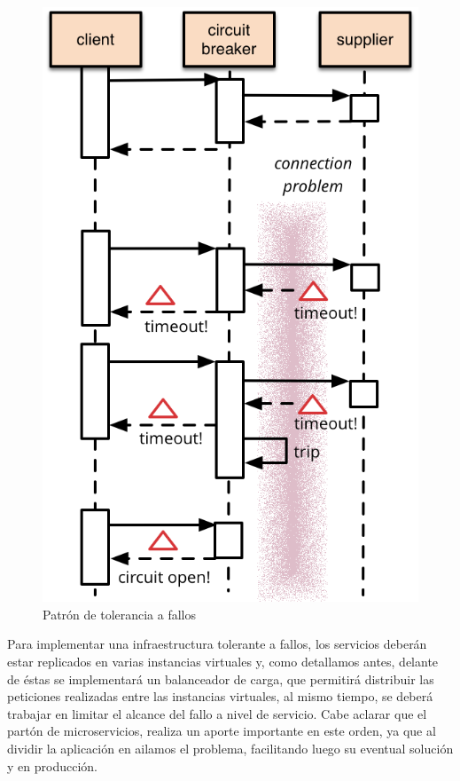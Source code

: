 \begin{figure}[H]
  \includegraphics[width=\linewidth]{src/images/04-capitulo-4/circuit_breaker.png}
  \caption{Patrón de tolerancia a fallos }
  \label{fig:circuit_breaker}
\end{figure}

Para implementar una infraestructura tolerante a fallos, los servicios deberán estar replicados en varias instancias virtuales y, como detallamos antes, delante de éstas se implementará un balanceador de carga, que permitirá distribuir las peticiones realizadas entre las instancias virtuales, al mismo tiempo, se deberá trabajar en limitar el alcance del fallo a nivel de servicio.  Cabe aclarar que el partón de microservicios, realiza un aporte importante en este orden, ya que al dividir la aplicación en  ailamos el problema, facilitando luego su eventual solución y  en producción.

